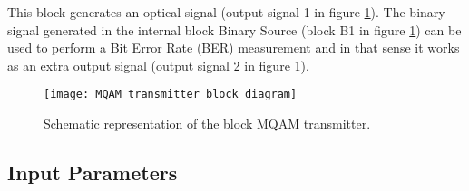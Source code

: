 This block generates an optical signal (output signal 1 in figure \ref{MQAM_transmitter_block_diagram}). The binary signal generated in the internal block Binary Source (block B1 in figure \ref{MQAM_transmitter_block_diagram}) can be used to perform a Bit Error Rate (BER) measurement and in that sense it works as an extra output signal (output signal 2 in figure \ref{MQAM_transmitter_block_diagram}).

\begin{figure}[h]
	\centering
	\texttt{[image: MQAM\_transmitter\_block\_diagram]}
	\caption{Schematic representation of the block MQAM transmitter.}\label{MQAM_transmitter_block_diagram}
\end{figure}

\subsection*{Input Parameters}

